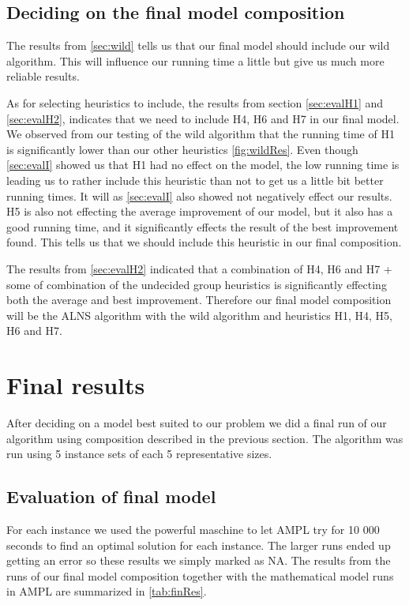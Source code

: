\documentclass[../main.tex]{subfiles}
\begin{document}
\subsection{Deciding on the final model composition}
\label{sec:finComp}
The results from \cref{sec:wild} tells us that our final model should include our wild algorithm. 
This will influence our running time a little but give us much more reliable results.
\par
As for selecting heuristics to include, the results from section \cref{sec:evalH1} and \cref{sec:evalH2}, indicates that we need to include H4, H6 and H7 in our final model.
We observed from our testing of the wild algorithm that the running time of H1 is significantly lower than our other heuristics \cref{fig:wildRes}. Even though \cref{sec:evalI} showed us that H1 had no effect on the model, the low running time is leading us to rather include this heuristic than not to get us a little bit better running times.
It will as \cref{sec:evalI} also showed not negatively effect our results.
H5 is also not effecting the average improvement of our model, but it also has a good running time, and it significantly effects the result of the best improvement found. This tells us that we should include this heuristic in our final composition. \par
The results from \cref{sec:evalH2} indicated that a combination of H4, H6 and H7 + some of combination of the undecided group heuristics is significantly effecting both the average and best improvement. Therefore our final model composition will be the ALNS algorithm with the wild algorithm and heuristics H1, H4, H5, H6 and H7.

\section{Final results}
\label{sec:evalFin}
After deciding on a model best suited to our problem we did a final run of our algorithm using composition described in the previous section.
The algorithm was run using 5 instance sets of each 5 representative sizes. 
\subsection{Evaluation of final model}
\label{sec:finRes}
For each instance we used the powerful maschine to let AMPL try for 10 000 seconds to find an optimal solution for each instance. 
The larger runs ended up getting an error so these results we simply marked as NA.
The results from the runs of our final model composition together with the mathematical model runs in AMPL are summarized in \cref{tab:finRes}. 
\end{document}
